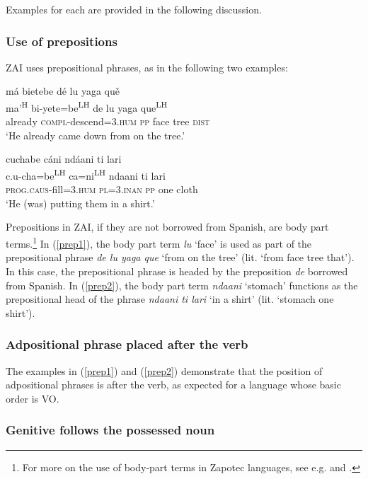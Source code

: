 Examples for each are provided in the following discussion.


\subsubsection{Use of prepositions}

ZAI uses prepositional phrases, as in the following two examples:

\ea\label{prep1}
\glll m\'{a} bietebe d\'{e} lu yaga qu\v{e} \\
ma'\textsuperscript{H} bi-yete=be\textsuperscript{LH} de lu yaga que\textsuperscript{LH} \\
already \textsc{compl}-descend=\textsc{3.hum} \textsc{pp} face tree \textsc{dist} \\
\glt `He already came down from on the tree.' 
\z

\ea\label{prep2}
\glll cuchabe c\'{a}ni nd\'{a}ani ti lari \\
c.u-cha=be\textsuperscript{LH} ca=ni\textsuperscript{LH} ndaani ti lari \\
\textsc{prog.caus}-fill=\textsc{3.hum} \textsc{pl=3.inan} \textsc{pp} one cloth \\
\glt `He (was) putting them in a shirt.'		
\z

Prepositions in ZAI, if they are not borrowed from Spanish, are body part terms.\footnote{For more on the use of body-part terms in Zapotec languages, see e.g. \citet{maclaury1989} and \citet{perez2011b}.} In (\ref{prep1}), the body part term \textit{lu} `face' is used as part of the prepositional phrase \textit{de lu yaga que} `from on the tree' (lit. `from face tree that'). In this case, the prepositional phrase is headed by the preposition \textit{de} borrowed from Spanish. In (\ref{prep2}), the body part term \textit{ndaani} `stomach' functions as the prepositional head of the phrase \textit{ndaani ti lari} `in a shirt' (lit. `stomach one shirt').


\subsubsection{Adpositional phrase placed after the verb}

The examples in (\ref{prep1}) and (\ref{prep2}) demonstrate that the position of adpositional phrases is after the verb, as expected for a language whose basic order is VO.



\subsubsection{Genitive follows the possessed noun}

